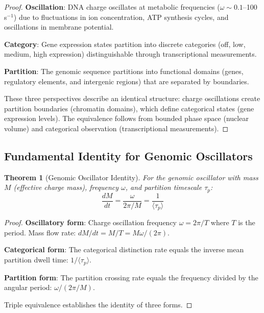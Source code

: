 \documentclass[11pt,a4paper]{article}
\newtheorem{theorem}{Theorem}[section]
\theoremstyle{remark}
\begin{document}
\begin{proof}
\textbf{Oscillation}: DNA charge oscillates at metabolic frequencies ($\omega \sim 0.1$--100 s$^{-1}$) due to fluctuations in ion concentration, ATP synthesis cycles, and oscillations in membrane potential.

\textbf{Category}: Gene expression states partition into discrete categories (off, low, medium, high expression) distinguishable through transcriptional measurements.

\textbf{Partition}: The genomic sequence partitions into functional domains (genes, regulatory elements, and intergenic regions) that are separated by boundaries.

These three perspectives describe an identical structure: charge oscillations create partition boundaries (chromatin domains), which define categorical states (gene expression levels). The equivalence follows from bounded phase space (nuclear volume) and categorical observation (transcriptional measurements).
\end{proof}

\subsection{Fundamental Identity for Genomic Oscillators}

\begin{theorem}[Genomic Oscillator Identity]
\label{thm:genomic_identity}
For the genomic oscillator with mass $M$ (effective charge mass), frequency $\omega$, and partition timescale $\tau_p$:
\begin{equation}
\frac{dM}{dt} = \frac{\omega}{2\pi/M} = \frac{1}{\langle\tau_p\rangle}
\end{equation}
\end{theorem}

\begin{proof}
\textbf{Oscillatory form}: Charge oscillation frequency $\omega = 2\pi/T$ where $T$ is the period. Mass flow rate: $dM/dt = M/T = M\omega/(2\pi)$.

\textbf{Categorical form}: The categorical distinction rate equals the inverse mean partition dwell time: $1/\langle\tau_p\rangle$.

\textbf{Partition form}: The partition crossing rate equals the frequency divided by the angular period: $\omega/(2\pi/M)$.

Triple equivalence establishes the identity of three forms.
\end{proof}
\end{document}
